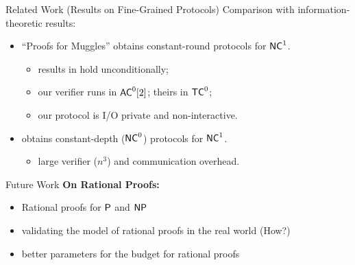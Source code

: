 \begin{frame}{Related Work (Results on Fine-Grained Protocols)}
	Comparison with information-theoretic results:
	\begin{itemize}[<+- | alert@+>]
		\item ``Proofs for Muggles'' \cite{muggles} obtains constant-round protocols for $\NC^1$.
		\begin{itemize}
			\item results in \cite{muggles} hold unconditionally; 
			\item our verifier runs in $\ACzt$; theirs in $\TC^0$;
			\item our protocol is I/O private and non-interactive.
		\end{itemize}
		\item \cite{gghkr07} obtains constant-depth ($\NC^0$) protocols for $\NC^1$.
		\begin{itemize}
			\item large verifier ($n^3$) and communication overhead.
		\end{itemize}
	\end{itemize}
\end{frame}

\begin{frame}{Future Work}
	\textbf{On Rational Proofs:}
	\begin{itemize}[<+- |  alert@+>]
		\item Rational proofs for $\P$ and $\NP$
		\item validating the model of rational proofs in the real world (How?)
		\item better parameters for the budget for rational proofs 
	\end{itemize}
\end{frame}